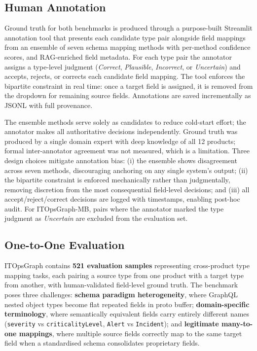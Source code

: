 \documentclass[sigconf, nonacm]{acmart}
\begin{document}
\subsection{Human Annotation}
\label{sec:annotation}

Ground truth for both benchmarks is produced through a purpose-built Streamlit annotation tool that presents each candidate type pair alongside field mappings from an ensemble of seven schema mapping methods with per-method confidence scores, and RAG-enriched field metadata. For each type pair the annotator assigns a type-level judgment (\emph{Correct}, \emph{Plausible}, \emph{Incorrect}, or \emph{Uncertain}) and accepts, rejects, or corrects each candidate field mapping. The tool enforces the bipartite constraint in real time: once a target field is assigned, it is removed from the dropdown for remaining source fields. Annotations are saved incrementally as JSONL with full provenance.

The ensemble methods serve solely as candidates to reduce cold-start effort; the annotator makes all authoritative decisions independently. Ground truth was produced by a single domain expert with deep knowledge of all 12 products; formal inter-annotator agreement was not measured, which is a limitation. Three design choices mitigate annotation bias: (i) the ensemble shows disagreement across seven methods, discouraging anchoring on any single system's output; (ii) the bipartite constraint is enforced mechanically rather than judgmentally, removing discretion from the most consequential field-level decisions; and (iii) all accept/reject/correct decisions are logged with timestamps, enabling post-hoc audit. For ITOpsGraph-MB, pairs where the annotator marked the type judgment as \emph{Uncertain} are excluded from the evaluation set.

\subsection{One-to-One Evaluation}

ITOpsGraph contains \textbf{521 evaluation samples} representing cross-product type mapping tasks, each pairing a source type from one product with a target type from another, with human-validated field-level ground truth. The benchmark poses three challenges: \textbf{schema paradigm heterogeneity}, where GraphQL nested object types become flat repeated fields in proto buffer; \textbf{domain-specific terminology}, where semantically equivalent fields carry entirely different names (\texttt{severity} vs \texttt{criticalityLevel}, \texttt{Alert} vs \texttt{Incident}); and \textbf{legitimate many-to-one mappings}, where multiple source fields correctly map to the same target field when a standardised schema consolidates proprietary fields.
\end{document}
